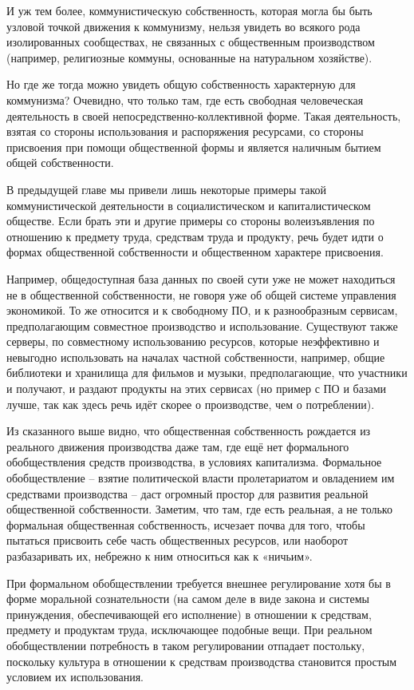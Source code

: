 \documentclass[../main]{subfiles}
\begin{document}
И уж тем более, коммунистическую собственность, которая могла бы быть узловой точкой движения к коммунизму, нельзя увидеть во всякого рода изолированных сообществах, не связанных с общественным производством (например, религиозные коммуны, основанные на натуральном хозяйстве).

Но где же тогда можно увидеть общую собственность характерную для коммунизма? Очевидно, что только там, где есть свободная человеческая деятельность в своей непосредственно-коллективной форме. Такая деятельность, взятая со стороны использования и распоряжения ресурсами, со стороны присвоения при помощи общественной формы и является наличным бытием общей собственности.

В предыдущей главе мы привели лишь некоторые примеры такой коммунистической деятельности в социалистическом и капиталистическом обществе. Если брать эти и другие примеры со стороны волеизъявления по отношению к предмету труда, средствам труда и продукту, речь будет идти о формах общественной собственности и общественном характере присвоения.

Например, общедоступная база данных по своей сути уже не может находиться не в общественной собственности, не говоря уже об общей системе управления экономикой. То же относится и к свободному ПО, и к разнообразным сервисам, предполагающим совместное производство и использование. Существуют также серверы, по совместному использованию ресурсов, которые неэффективно и невыгодно использовать на началах частной собственности, например, общие библиотеки и хранилища для фильмов и музыки, предполагающие, что участники и получают, и раздают продукты на этих сервисах (но пример с ПО и базами лучше, так как здесь речь идёт скорее о производстве, чем о потреблении).

Из сказанного выше видно, что общественная собственность рождается из реального движения производства даже там, где ещё нет формального обобществления средств производства, в условиях капитализма. Формальное обобществление – взятие политической власти пролетариатом и овладением им средствами производства – даст огромный простор для развития реальной общественной собственности. Заметим, что там, где есть реальная, а не только формальная общественная собственность, исчезает почва для того, чтобы пытаться присвоить себе часть общественных ресурсов, или наоборот разбазаривать их, небрежно к ним относиться как к «ничьим».

При формальном обобществлении требуется внешнее регулирование хотя бы в форме моральной сознательности (на самом деле в виде закона и системы принуждения, обеспечивающей его исполнение) в отношении к средствам, предмету и продуктам труда, исключающее подобные вещи. При реальном обобществлении потребность в таком регулировании отпадает постольку, поскольку культура в отношении к средствам производства становится простым условием их использования.
\end{document}

